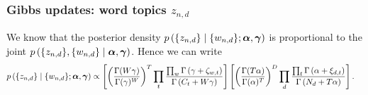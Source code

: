 \subsubsection{Gibbs updates: word topics $z_{n, d}$}
We know that the posterior density $p\left(\{z_{n, d}\} \mid \{w_{n, d}\}; \boldsymbol{\mathbf{\alpha}}, \boldsymbol{\mathbf{\gamma}}\right)$ is proportional to the joint $p\left(\{z_{n, d}\}, \{w_{n, d}\} \mid \boldsymbol{\mathbf{\alpha}}, \boldsymbol{\mathbf{\gamma}}\right)$. Hence we can write
\begin{align}
    p\left(\{z_{n, d}\} \mid \{w_{n, d}\}; \boldsymbol{\mathbf{\alpha}}, \boldsymbol{\mathbf{\gamma}}\right)
    &\propto
        \left[
            \left(
                \frac
                {
                    \Gamma(W \gamma)
                }
                {
                    \Gamma(\gamma)^W
                }
            \right)^T
            \prod_t
                \frac
                {
                    \prod_w \Gamma\left(\gamma + \zeta_{w, t}\right)
                }
                {
                    \Gamma\left(C_t + W\gamma\right)
                }
        \right]
        \left[
            \left(
                \frac
                {
                    \Gamma(T \alpha)
                }
                {
                    \Gamma(\alpha)^T
                }
            \right)^D
            \prod_d
                \frac
                {
                    \prod_t \Gamma\left(\alpha + \xi_{d, t}\right)
                }
                {
                    \Gamma\left(N_d + T \alpha\right)
                }
        \right].
\end{align}


